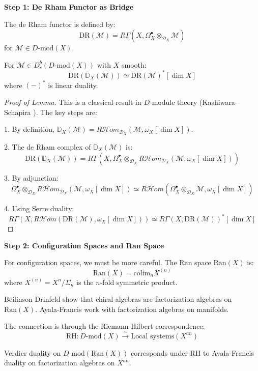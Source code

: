 \textbf{Step 1: De Rham Functor as Bridge}

The de Rham functor is defined by:
$$\text{DR}(\mathcal{M}) = R\Gamma(X, \Omega^{\bullet}_X \otimes_{\mathcal{D}_X} \mathcal{M})$$
for $\mathcal{M} \in D\text{-mod}(X)$.

\begin{lemma}\label{lem:DR-verdier-compat}
For $\mathcal{M} \in D^b_c(D\text{-mod}(X))$ with $X$ smooth:
$$\text{DR}(\mathbb{D}_X(\mathcal{M})) \simeq \text{DR}(\mathcal{M})^* [\dim X]$$
where $(-)^*$ is linear duality.
\end{lemma}

\begin{proof}[Proof of Lemma]
This is a classical result in $D$-module theory (Kashiwara-Schapira \cite{KS90}). 
The key steps are:

1. By definition, $\mathbb{D}_X(\mathcal{M}) = R\mathcal{H}om_{\mathcal{D}_X}(\mathcal{M}, 
\omega_X[\dim X])$.

2. The de Rham complex of $\mathbb{D}_X(\mathcal{M})$ is:
$$\text{DR}(\mathbb{D}_X(\mathcal{M})) = R\Gamma(X, \Omega^{\bullet}_X 
\otimes_{\mathcal{D}_X} R\mathcal{H}om_{\mathcal{D}_X}(\mathcal{M}, \omega_X[\dim X]))$$

3. By adjunction:
$$\Omega^{\bullet}_X \otimes_{\mathcal{D}_X} R\mathcal{H}om_{\mathcal{D}_X}(\mathcal{M}, 
\omega_X[\dim X]) \simeq R\mathcal{H}om(\Omega^{\bullet}_X \otimes_{\mathcal{D}_X} 
\mathcal{M}, \omega_X[\dim X])$$

4. Using Serre duality:
$$R\Gamma(X, R\mathcal{H}om(\text{DR}(\mathcal{M}), \omega_X[\dim X])) 
\simeq R\Gamma(X, \text{DR}(\mathcal{M}))^* [\dim X]$$
\end{proof}

\textbf{Step 2: Configuration Spaces and Ran Space}

For configuration spaces, we must be more careful. The Ran space $\text{Ran}(X)$ is:
$$\text{Ran}(X) = \text{colim}_{n} X^{(n)}$$
where $X^{(n)} = X^n / \Sigma_n$ is the $n$-fold symmetric product.

Beilinson-Drinfeld \cite{BD04} show that chiral algebras are factorization algebras on 
$\text{Ran}(X)$. Ayala-Francis \cite{AF15} work with factorization algebras on manifolds.

The connection is through the Riemann-Hilbert correspondence:
$$\text{RH}: D\text{-mod}(X) \xrightarrow{\sim} \text{Local systems}(X^{an})$$

\begin{lemma}\label{lem:ran-duality-AF}
Verdier duality on $D\text{-mod}(\text{Ran}(X))$ corresponds under $\text{RH}$ to 
Ayala-Francis duality on factorization algebras on $X^{an}$.
\end{lemma}

